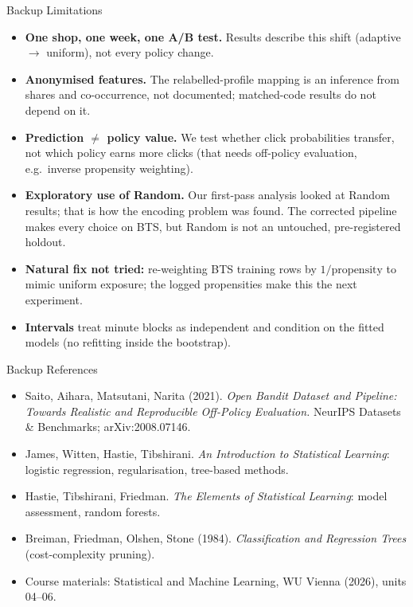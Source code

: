 \documentclass[aspectratio=169,10pt]{beamer}
\begin{document}
\begin{frame}{Backup \textperiodcentered{} Limitations}
\small
\begin{itemize}\setlength{\itemsep}{5pt}
\item \textbf{One shop, one week, one A/B test.} Results describe this shift (adaptive \(\to\) uniform), not every policy change.
\item \textbf{Anonymised features.} The relabelled-profile mapping is an inference from shares and co-occurrence, not documented; matched-code results do not depend on it.
\item \textbf{Prediction \(\ne\) policy value.} We test whether click probabilities transfer, not which policy earns more clicks (that needs off-policy evaluation, e.g.\ inverse propensity weighting).
\item \textbf{Exploratory use of Random.} Our first-pass analysis looked at Random results; that is how the encoding problem was found. The corrected pipeline makes every choice on BTS, but Random is not an untouched, pre-registered holdout.
\item \textbf{Natural fix not tried:} re-weighting BTS training rows by \(1/\text{propensity}\) to mimic uniform exposure; the logged propensities make this the next experiment.
\item \textbf{Intervals} treat minute blocks as independent and condition on the fitted models (no refitting inside the bootstrap).
\end{itemize}
\end{frame}

\begin{frame}{Backup \textperiodcentered{} References}
\small
\begin{itemize}\setlength{\itemsep}{5pt}
\item Saito, Aihara, Matsutani, Narita (2021). \emph{Open Bandit Dataset and Pipeline: Towards Realistic and Reproducible Off-Policy Evaluation.} NeurIPS Datasets \& Benchmarks; arXiv:2008.07146.
\item James, Witten, Hastie, Tibshirani. \emph{An Introduction to Statistical Learning}: logistic regression, regularisation, tree-based methods.
\item Hastie, Tibshirani, Friedman. \emph{The Elements of Statistical Learning}: model assessment, random forests.
\item Breiman, Friedman, Olshen, Stone (1984). \emph{Classification and Regression Trees} (cost-complexity pruning).
\item Course materials: Statistical and Machine Learning, WU Vienna (2026), units 04--06.
\end{itemize}
\end{frame}
\end{document}
